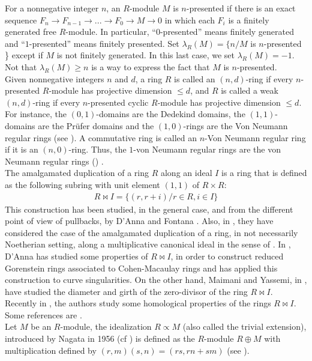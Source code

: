 \documentclass{amsart}
\theoremstyle{definition}
\theoremstyle{remark}
\theoremstyle{Definition and Notation}
\begin{document}
For a nonnegative integer $n$, an $R$-module $M$ is $n$-presented
if there is an exact sequence $F_n\rightarrow F_{n-1} \rightarrow
...\rightarrow F_0 \rightarrow M\rightarrow 0$ in which each $F_i$
is a finitely generated free $R$-module. In particular,
``$0$-presented'' means finitely generated and ``$1$-presented''
means finitely presented. Set $\lambda_{R}(M)=\{ n/ M$ is
$n$-presented \}
 except if $M$ is not finitely generated. In this last case, we set $\lambda_{R}(M)= -1$. Not that
$\lambda_{R}(M)\geq n$ is a way to express the fact that $M$ is
$n$-presented. \\
Given nonnegative integers $n$ and $d$, a ring $R$ is called an
$(n,d)$-ring if every $n$-presented $R$-module has projective
dimension $\leq d$, and $R$ is called a weak $(n,d)$-ring  if
every $n$-presented cyclic $R$-module has projective dimension
$\leq d$. For instance, the $(0,1)$-domains are the Dedekind
domains, the $(1,1)$-domains are the Pr\"ufer domains and the
$(1,0)$-rings are the Von Neumann regular rings (see \cite{C, KM1,
KM2, M1, M2}). A commutative ring is called an $n$-Von Neumann
regular ring if it is an $(n,0)$-ring. Thus, the $1$-von Neumann
regular rings are the von Neumann regular rings (\cite[Theorem
1.3]{C}) . \\

The amalgamated duplication of a ring $R$ along an ideal $I$ is a
ring that is defined as the following subring with unit element
$(1,1)$ of $R\times R$:
\begin{eqnarray*}
   &R\bowtie I =\{(r,r+i)/r\in R,i\in I\}&
\end{eqnarray*}
This construction has been studied, in the general case, and from
the different point of view of pullbacks, by  D'Anna and Fontana
\cite{AF2}. Also, in \cite{AF1}, they  have considered the case of
the amalgamated duplication of a ring, in not necessarily
Noetherian setting, along a multiplicative canonical ideal in the
sense of \cite{HHP}. In \cite{A},  D'Anna has studied some
properties of $R\bowtie I $, in order to construct reduced
Gorenstein rings associated to Cohen-Macaulay rings and has
applied this construction to curve singularities. On the other
hand,  Maimani and  Yassemi, in \cite{MY}, have studied the
diameter and girth of the zero-divisor of the ring $R\bowtie I $.
Recently in \cite{CM}, the authors study some homological
properties of the rings $R\bowtie I$. Some references are
\cite{A, AF1, AF2, MY}. \\

Let $M$ be an $R$-module, the idealization $R\propto M$ (also
called the trivial extension), introduced by Nagata in 1956 (cf
 \cite{N}) is defined as the $R$-module $R\oplus M$ with multiplication
defined by $(r,m)(s,n)=(rs,rn+sm)$ (see
\cite{G, H, KM1, KM2}). \\
\end{document}
